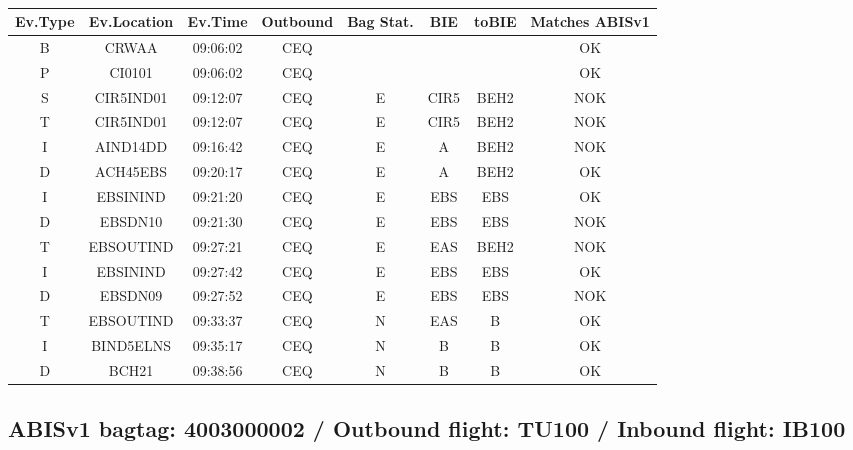 \documentclass{report}
\begin{document}
\paragraph{}
\begin{longtable}{cccccccc}    \toprule
\rowcolor{white!50}
\textbf{Ev.Type} & \textbf{Ev.Location} & \textbf{Ev.Time} & \textbf{Outbound} & \textbf{Bag Stat.} & \textbf{BIE} & \textbf{toBIE} & \textbf{Matches ABISv1} \\\midrule
B & CRWAA & 09:06:02  & CEQ &  &  &  & OK\\
P & CI0101 & 09:06:02  & CEQ &  &  &  & OK\\
S & CIR5IND01 & 09:12:07  & CEQ & E & CIR5 & BEH2 & NOK\\
T & CIR5IND01 & 09:12:07  & CEQ & E & CIR5 & BEH2 & NOK\\
I & AIND14DD & 09:16:42  & CEQ & E & A & BEH2 & NOK\\
D & ACH45EBS & 09:20:17  & CEQ & E & A & BEH2 & OK\\
I & EBSININD & 09:21:20  & CEQ & E & EBS & EBS & OK\\
D & EBSDN10 & 09:21:30  & CEQ & E & EBS & EBS & NOK\\
T & EBSOUTIND & 09:27:21  & CEQ & E & EAS & BEH2 & NOK\\
I & EBSININD & 09:27:42  & CEQ & E & EBS & EBS & OK\\
D & EBSDN09 & 09:27:52  & CEQ & E & EBS & EBS & NOK\\
T & EBSOUTIND & 09:33:37  & CEQ & N & EAS & B & OK\\
I & BIND5ELNS & 09:35:17  & CEQ & N & B & B & OK\\
D & BCH21 & 09:38:56  & CEQ & N & B & B & OK\\
\bottomrule
\end{longtable}
\subsection*{ABISv1 bagtag: 4003000002 / Outbound flight: TU100 / Inbound flight: IB100}
\end{document}
